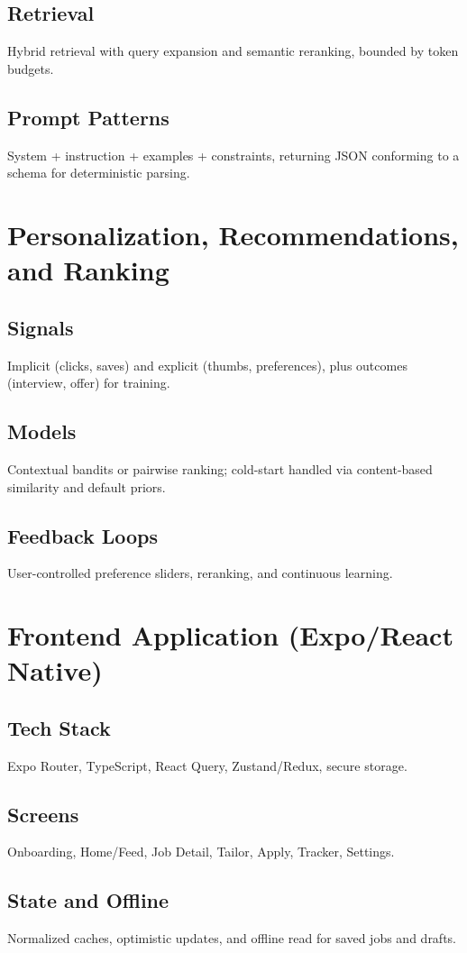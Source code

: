 \documentclass[12pt,a4paper]{article}
\begin{document}
\subsection{Retrieval}
Hybrid retrieval with query expansion and semantic reranking, bounded by token budgets.
\subsection{Prompt Patterns}
System + instruction + examples + constraints, returning JSON conforming to a schema for deterministic parsing.

\section{Personalization, Recommendations, and Ranking}
\subsection{Signals}
Implicit (clicks, saves) and explicit (thumbs, preferences), plus outcomes (interview, offer) for training.
\subsection{Models}
Contextual bandits or pairwise ranking; cold-start handled via content-based similarity and default priors.
\subsection{Feedback Loops}
User-controlled preference sliders, reranking, and continuous learning.

\section{Frontend Application (Expo/React Native)}
\subsection{Tech Stack}
Expo Router, TypeScript, React Query, Zustand/Redux, secure storage.
\subsection{Screens}
Onboarding, Home/Feed, Job Detail, Tailor, Apply, Tracker, Settings.
\subsection{State and Offline}
Normalized caches, optimistic updates, and offline read for saved jobs and drafts.
\end{document}
